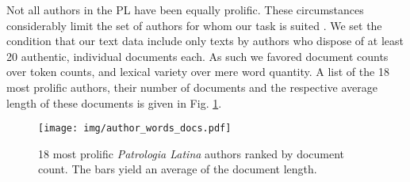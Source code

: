\documentclass[11pt]{article}
\begin{document}
Not all authors in the PL have been equally prolific. These circumstances considerably limit the set of authors for whom our task is suited \cite{eder2015}. We set the condition that our text data include only texts by authors who dispose of at least 20 authentic, individual documents each. As such we favored document counts over token counts, and lexical variety over mere word quantity. A list of the 18 most prolific authors, their number of documents and the respective average length of these documents is given in Fig. \ref{fig:pl}.

\begin{figure}[h!]
    \hspace*{-0.5cm}
    \texttt{[image: img/author\_words\_docs.pdf]}
    \caption{
	18 most prolific \textit{Patrologia Latina} authors ranked by document count. The bars yield an average of the document length.
    }
    \label{fig:pl}
\end{figure}
\end{document}
